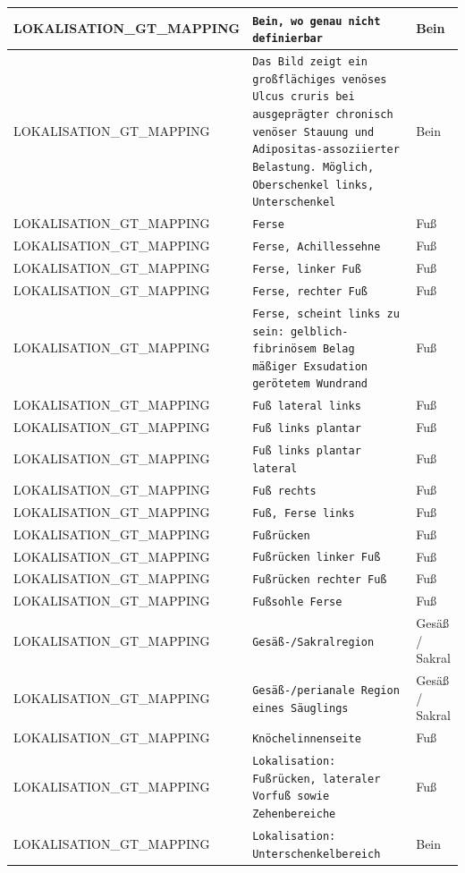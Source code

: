 \begin{longtable}{|p{3.5cm}|p{5cm}|p{6.5cm}|}
LOKALISATION\_GT\_MAPPING & \texttt{Bein, wo genau nicht definierbar} & Bein \\ \hline
LOKALISATION\_GT\_MAPPING & \texttt{Das Bild zeigt ein großflächiges venöses Ulcus cruris bei ausgeprägter chronisch venöser Stauung und Adipositas-assoziierter Belastung. Möglich, Oberschenkel links, Unterschenkel} & Bein \\ \hline
LOKALISATION\_GT\_MAPPING & \texttt{Ferse} & Fuß \\ \hline
LOKALISATION\_GT\_MAPPING & \texttt{Ferse, Achillessehne} & Fuß \\ \hline
LOKALISATION\_GT\_MAPPING & \texttt{Ferse, linker Fuß} & Fuß \\ \hline
LOKALISATION\_GT\_MAPPING & \texttt{Ferse, rechter Fuß} & Fuß \\ \hline
LOKALISATION\_GT\_MAPPING & \texttt{Ferse, scheint links zu sein:
gelblich-fibrinösem Belag
mäßiger Exsudation
gerötetem Wundrand} & Fuß \\ \hline
LOKALISATION\_GT\_MAPPING & \texttt{Fuß lateral links} & Fuß \\ \hline
LOKALISATION\_GT\_MAPPING & \texttt{Fuß links plantar} & Fuß \\ \hline
LOKALISATION\_GT\_MAPPING & \texttt{Fuß links plantar  lateral} & Fuß \\ \hline
LOKALISATION\_GT\_MAPPING & \texttt{Fuß rechts} & Fuß \\ \hline
LOKALISATION\_GT\_MAPPING & \texttt{Fuß, Ferse links} & Fuß \\ \hline
LOKALISATION\_GT\_MAPPING & \texttt{Fußrücken} & Fuß \\ \hline
LOKALISATION\_GT\_MAPPING & \texttt{Fußrücken linker Fuß} & Fuß \\ \hline
LOKALISATION\_GT\_MAPPING & \texttt{Fußrücken rechter Fuß} & Fuß \\ \hline
LOKALISATION\_GT\_MAPPING & \texttt{Fußsohle Ferse} & Fuß \\ \hline
LOKALISATION\_GT\_MAPPING & \texttt{Gesäß-/Sakralregion} & Gesäß / Sakral \\ \hline
LOKALISATION\_GT\_MAPPING & \texttt{Gesäß-/perianale Region eines Säuglings} & Gesäß / Sakral \\ \hline
LOKALISATION\_GT\_MAPPING & \texttt{Knöchelinnenseite} & Fuß \\ \hline
LOKALISATION\_GT\_MAPPING & \texttt{Lokalisation: Fußrücken, lateraler Vorfuß sowie Zehenbereiche} & Fuß \\ \hline
LOKALISATION\_GT\_MAPPING & \texttt{Lokalisation: Unterschenkelbereich} & Bein \\ \hline

\end{longtable}
